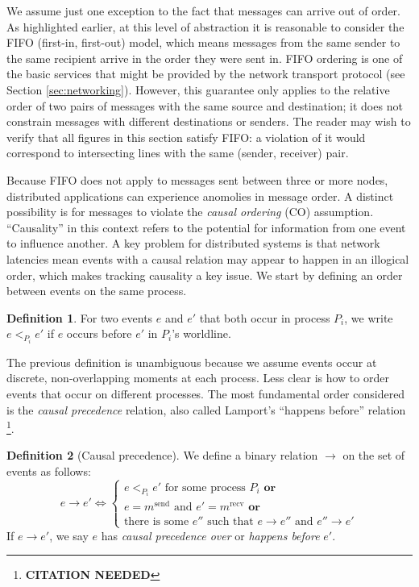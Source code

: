 \documentclass[]             %
{NASA}                       %
\theoremstyle{definition}
\newtheorem{definition}{Definition}[section]
\newcommand{\citationneeded}{\footnote{\textbf{CITATION NEEDED}}}
\begin{document}
We assume just one exception to the fact that messages can arrive out
of order. As highlighted earlier, at this level of abstraction it is
reasonable to consider the FIFO (first-in, first-out) model, which
means messages from the same sender to the same recipient arrive in
the order they were sent in. FIFO ordering is one of the basic
services that might be provided by the network transport protocol (see
Section \ref{sec:networking}). However, this guarantee only applies to
the relative order of two pairs of messages with the same source and
destination; it does not constrain messages with different
destinations or senders. The reader may wish to verify that all
figures in this section satisfy FIFO: a violation of it would
correspond to intersecting lines with the same (sender, receiver)
pair.

Because FIFO does not apply to messages sent between three or more
nodes, distributed applications can experience anomolies in message
order. A distinct possibility is for messages to violate the
\emph{causal ordering} (CO) assumption. ``Causality'' in this context
refers to the potential for information from one event to influence
another. A key problem for distributed systems is that network
latencies mean events with a causal relation may appear to happen in
an illogical order, which makes tracking causality a key issue. We
start by defining an order between events on the same process.

\begin{definition}
  For two events $e$ and $e'$ that both occur in process $P_i$, we
  write $e <_{P_i} e'$ if $e$ occurs before $e'$ in $P_i$'s
  worldline.
\end{definition}

The previous definition is unambiguous because we assume events occur
at discrete, non-overlapping moments at each process. Less clear is
how to order events that occur on different processes. The most
fundamental order considered is the \emph{causal precedence} relation,
also called Lamport's ``happens before'' relation \citationneeded.

\begin{definition}[Causal precedence]
  \label{def:causalprecedence}
  We define a binary relation $\to$ on the set of events as follows:
  \[e \to e' \iff
  \begin{cases}
    e <_{P_i} e' \textrm{ for some process $P_i$}
    \textbf{ or} \\
    e = m^\textrm{send} \textrm{ and } e' = m^\textrm{recv}
    \textbf{ or} \\
    \textrm{there is some } e'' \textrm{ such that } e \to e'' \textrm{ and } e'' \to e'
  \end{cases}
  \]
  If $e \to e'$, we say $e$ has \emph{causal precedence over} or
  \emph{happens before} $e'$.
\end{definition}%
\end{document}
